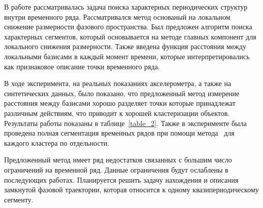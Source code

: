 \documentclass[12pt, twoside]{article}
\numberwithin{equation}{section}
\begin{document}
В работе рассматривалась задача поиска характерных периодических структур внутри временного ряда. 
Рассматривался метод основаный на локальном снижение размерности фазового пространства. 
Был предложен алгоритм поиска характерных сегментов, который основывается на методе главных компонент для локального снижения размерности. 
Также введена функция расстояния между локальными базисами в каждый момент времени, которые интерпретировались как признаковое описание точки временного ряда.

В ходе эксперимента, на реальных показаниях акселерометра, а также на синтетических данных, было показано, что предложенный метод измерение расстояния между базисами хорошо разделяет точки которые принадлежат различным действиям, что приводит к хорошей кластеризации объектов. 
Результаты работы показаны в таблице~\ref{table_2}.
Также в эксперименте была проведена полная сегментация временных рядов при помощи метода~\cite{motrenko2015} для каждого кластера по отдельности.

Предложенный метод имеет ряд недостатков связанных с большим число ограничений на временной ряд.
Данные ограничения будут ослаблены в последующих работах. Планируется решить задачу нахождения и описания замкнутой фазовой траектории, которая относится к одному квазипериодическому сегменту. 
\end{document}
